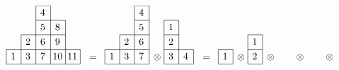 \documentclass[twoside,12pt,reqno]{amsart}
\begin{document}
$$
\begin{picture}(90, 60)%
\put(0,0){\line(1,0){75}}
\put(0,15){\line(1,0){75}}
\put(15,30){\line(1,0){45}}
\put(30,45){\line(1,0){30}}
\put(30,60){\line(1,0){15}}
\put(0,0){\line(0,1){15}}
\put(15,0){\line(0,1){30}}
\put(30,0){\line(0,1){60}}
\put(45,0){\line(0,1){60}}
\put(60,0){\line(0,1){45}}
\put(75,0){\line(0,1){15}}
\put(7,8){\makebox(0,0){1}}
\put(22,8){\makebox(0,0){3}}
\put(37,8){\makebox(0,0){7}}
\put(52,8){\makebox(0,0){10}}
\put(67,8){\makebox(0,0){11}}
\put(22,23){\makebox(0,0){2}}
\put(37,23){\makebox(0,0){6}}
\put(52,23){\makebox(0,0){9}}
\put(37,38){\makebox(0,0){5}}
\put(52,38){\makebox(0,0){8}}
\put(37,53){\makebox(0,0){4}}
\end{picture}
\quad
\begin{picture}(45, 60)%
\put(0,0){\line(1,0){45}}
\put(0,15){\line(1,0){45}}
\put(15,30){\line(1,0){30}}
\put(30,45){\line(1,0){15}}
\put(30,60){\line(1,0){15}}
\put(0,0){\line(0,1){15}}
\put(15,0){\line(0,1){30}}
\put(30,0){\line(0,1){60}}
\put(45,0){\line(0,1){60}}
\put(7,8){\makebox(0,0){1}}
\put(22,8){\makebox(0,0){3}}
\put(37,8){\makebox(0,0){7}}
\put(22,23){\makebox(0,0){2}}
\put(37,23){\makebox(0,0){6}}
\put(37,38){\makebox(0,0){5}}
\put(37,53){\makebox(0,0){4}}
\put(53,7){\makebox(0,0){$\otimes$}}
\put(-12,6){\makebox(0,0){$=$}}
\end{picture}
\begin{picture}(70, 60)%
\put(15,0){\line(1,0){30}}
\put(15,15){\line(1,0){30}}
\put(15,30){\line(1,0){15}}
\put(15,45){\line(1,0){15}}
\put(30,0){\line(0,1){45}}
\put(15,0){\line(0,1){45}}
\put(45,0){\line(0,1){15}}
\put(22,8){\makebox(0,0){3}}
\put(37,8){\makebox(0,0){4}}
\put(22,23){\makebox(0,0){2}}
\put(22,38){\makebox(0,0){1}}
\end{picture}
\begin{picture}(30, 60)%
\put(0,0){\line(1,0){15}}
\put(0,15){\line(1,0){15}}
\put(0,0){\line(0,1){15}}
\put(15,0){\line(0,1){15}}
\put(7,8){\makebox(0,0){1}}
\put(23,7){\makebox(0,0){$\otimes$}}
\put(53,7){\makebox(0,0){$\otimes$}}
\put(83,7){\makebox(0,0){$\otimes$}}
\put(113,7){\makebox(0,0){$\otimes$}}
\put(-12,6){\makebox(0,0){$=$}}
\end{picture}
\begin{picture}(30, 60)%
\put(0,0){\line(1,0){15}}
\put(0,15){\line(1,0){15}}
\put(0,30){\line(1,0){15}}
\put(0,0){\line(0,1){30}}
\put(15,0){\line(0,1){30}}
\put(7,8){\makebox(0,0){2}}
\put(7,23){\makebox(0,0){1}}
\end{picture}
\begin{picture}(30, 60)%

\end{picture}$$
\end{document}
